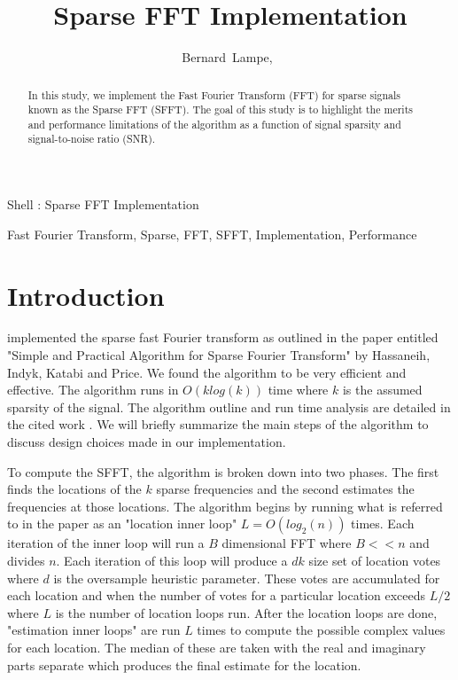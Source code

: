 \documentclass[journal]{IEEEtran}
\begin{document}
\title{Sparse FFT Implementation}

\author{Bernard~Lampe,~}

{Shell \MakeLowercase{\Lampe}: Sparse FFT Implementation}

\maketitle

\begin{abstract}
In this study, we implement the Fast Fourier Transform (FFT) for sparse signals known as the Sparse FFT (SFFT). The goal of this study is to highlight the merits and performance limitations of the algorithm as a function of signal sparsity and signal-to-noise ratio (SNR).
\end{abstract}

\begin{IEEEkeywords}
Fast Fourier Transform, Sparse, FFT, SFFT, Implementation, Performance
\end{IEEEkeywords}

\section{Introduction}
 implemented the sparse fast Fourier transform as outlined in the paper entitled "Simple and Practical Algorithm for Sparse Fourier Transform" by Hassaneih, Indyk, Katabi and Price\cite{hass}. We found the algorithm to be very efficient and effective. The algorithm runs in \(O(klog(k))\) time where \(k\) is the assumed sparsity of the signal. The algorithm outline and run time analysis are detailed in the cited work \cite{hass}. We will briefly summarize the main steps of the algorithm to discuss design choices made in our implementation.

\par To compute the SFFT, the algorithm is broken down into two phases. The first finds the locations of the \(k\) sparse frequencies and the second estimates the frequencies at those locations. The algorithm begins by running what is referred to in the paper as an "location inner loop" \(L = O(log_2(n))\) times. Each iteration of the inner loop will run a \(B\) dimensional FFT where \(B << n\) and divides \(n\). Each iteration of this loop will produce a \(dk\) size set of location votes where \(d\) is the oversample heuristic parameter. These votes are accumulated for each location and when the number of votes for a particular location exceeds \(L/2\) where \(L\) is the number of location loops run. After the location loops are done, "estimation inner loops" are run \(L\) times to compute the possible complex values for each location. The median of these are taken with the real and imaginary parts separate which produces the final estimate for the location.
\end{document}
